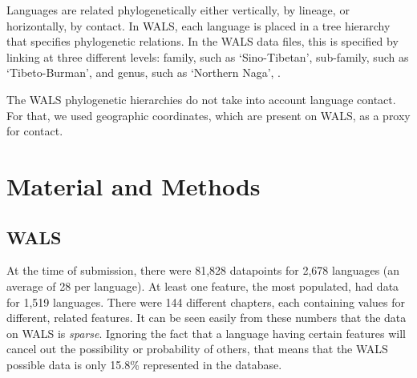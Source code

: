 \documentclass[11pt]{article}
\begin{document}
Languages are related phylogenetically either vertically, by lineage, or horizontally, by contact. In WALS, each language is placed in a tree hierarchy that specifies phylogenetic relations. In the WALS data files, this is specified by linking at three different levels: family, such as `Sino-Tibetan', sub-family, such as `Tibeto-Burman', and genus, such as `Northern Naga', . %

The WALS phylogenetic hierarchies do not take into account language contact. For that, we used geographic coordinates, which are present on WALS, as a proxy for contact. 



\section{Material and Methods}
\subsection{WALS}

At the time of submission, there were 81,828 datapoints for 2,678 languages (an average of 28 per language). At least one feature, the most populated, had data for 1,519 languages. There were 144 different chapters, each containing values for different, related features. It can be seen easily from these numbers that the data on WALS is \emph{sparse}. Ignoring the fact that a language having certain features will cancel out the possibility or probability of others, that means that the WALS possible data is only 15.8\% represented in the database.
\end{document}

